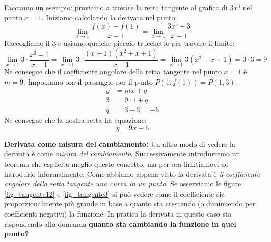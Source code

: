 Facciamo un esempio: proviamo a trovare la retta tangente al grafico di $3x^3$ 
nel punto $x = 1$. Iniziamo calcolando la derivata nel punto:
\begin{equation*}
	\lim_{x \to 1} \dfrac{f(x) - f(1)}{x - 1} = \lim_{x \to 1} 
    \dfrac{3x^3 - 3}{x - 1}
\end{equation*}
Raccogliamo il $3$ e usiamo qualche piccolo trucchetto per trovare il limite:
\begin{equation*}
	\lim_{x \to 1} 3 \cdot \dfrac{x^3 - 1}{x - 1} = \lim_{x \to 1} 3 \cdot 
    \dfrac{(x - 1)(x^2 + x + 1)}{x - 1} = \lim_{x \to 1} 3(x^2 + x + 1) = 3 
    \cdot 3 = 9
\end{equation*}
Ne consegue che il coefficiente angolare della retta tangente nel punto $x = 1$ 
è $m = 9$. Imponiamo ora il passaggio per il punto $P(1, f(1)) = P(1, 3)$:
\begin{align*}
	y &= mx + q\\
	3 &= 9 \cdot 1 + q\\
	q &= 3 - 9 = -6
\end{align*}
Ne consegue che la nostra retta ha equazione:
\begin{equation*}
	y = 9x - 6
\end{equation*}


\textbf{Derivata come misura del cambiamento:} Un altro modo di vedere la 
derivata è come \textit{misura del cambiamento}. Successivamente introdurremo 
un teorema che esplicita meglio questo concetto, ma per ora limitiamoci ad 
introdurlo informalmente. Come abbiamo appena visto la derivata è \textit{il 
coefficiente angolare della retta tangente una curva in un punto}. Se 
osserviamo le figure \ref{fig_tangente12} e \ref{fig_tangente3} si può vedere 
come il coefficiente sia proporzionalmente più grande in base a quanto sta 
crescendo (o diminuendo per coefficienti negativi) la funzione. In pratica la 
derivata in questo caso sta rispondendo alla domanda \textbf{quanto sta 
cambiando la funzione in quel punto?} 

